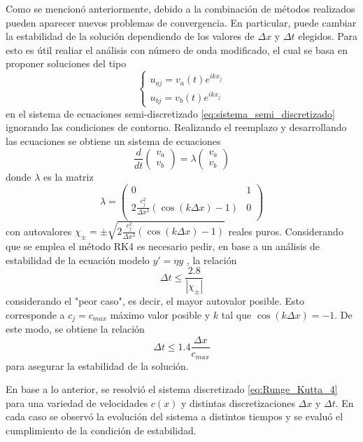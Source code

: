 \documentclass[aps,prb,twocolumn,superscriptaddress,floatfix,longbibliography,10pt]{revtex4-2}
\newcounter{para}
\begin{document}
Como se mencionó anteriormente, debido a la combinación de métodos realizados pueden aparecer nuevos problemas de convergencia. En particular, puede cambiar la estabilidad de la solución dependiendo de los valores de $\Delta x$ y $\Delta t$ elegidos. Para esto es útil realiar el análisis con número de onda modificado, el cual se basa en proponer soluciones del tipo
\[\left\{\begin{matrix}
  u_{a j} = v_a(t)e^{i k x_j}\\
  u_{b j} = v_b(t)e^{i k x_j} 
\end{matrix}\right.\]
en el sistema de ecuaciones semi-discretizado \ref{eq:sistema_semi_discretizado} ignorando las condiciones de contorno. Realizando el reemplazo y desarrollando las ecuaciones se obtiene un sistema de ecuaciones
\[
\frac{d}{dt} \begin{pmatrix}
 v_a \\ v_b
 \end{pmatrix}
 =  
 \lambda
 \begin{pmatrix}
 v_a \\ v_b
 \end{pmatrix}
\]
donde $\lambda$ es la matriz
\[\lambda = \begin{pmatrix}
  0 & 1 \\
  2 \frac{c_j^2}{\Delta x^2}(\cos{(k \Delta x)} - 1) & 0 \\
  \end{pmatrix}\]
con autovalores $\chi_{\pm} = \pm \sqrt{2 \frac{c_j^2}{\Delta x^2}(\cos{(k \Delta x)} - 1)}$ reales puros. Considerando que se emplea el método RK4 es necesario pedir, en base a un análisis de estabilidad de la ecuación modelo $y' = \eta y$ \cite{Moin}, la relación
\[\Delta t \leq \frac{2.8}{ |\chi_{\pm}| }\]
considerando el "peor caso", es decir, el mayor autovalor posible. Esto corresponde a $c_j = c_{max}$ máximo valor posible y $k$ tal que $\cos{(k \Delta x)} = -1$. De este modo, se obtiene la relación
\begin{equation}
  \Delta t \leq 1.4 \frac{\Delta x}{c_{max}}
  \label{eq:condicion_estabilidad}
\end{equation}
para asegurar la estabilidad de la solución.


En base a lo anterior, se resolvió el sistema discretizado \ref{eq:Runge_Kutta_4} para una variedad de velocidades $c(x)$ y distintas discretizaciones $\Delta x$ y $\Delta t$. En cada caso se observó la evolución del sistema a distintos tiempos y se evaluó el cumplimiento de la condición de estabilidad.
\end{document}
